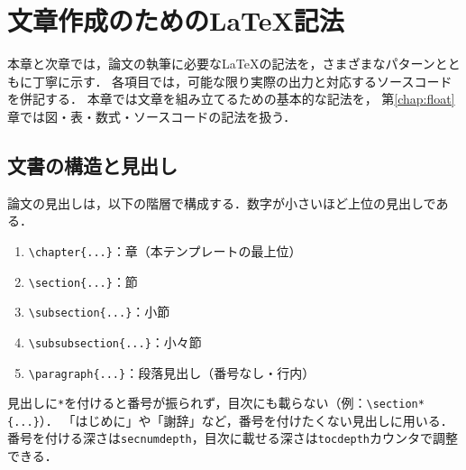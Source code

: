 \chapter{文章作成のための\LaTeX 記法}
\label{chap:latex}

本章と次章では，論文の執筆に必要な\LaTeX の記法を，さまざまなパターンとともに丁寧に示す．
各項目では，可能な限り実際の出力と対応するソースコードを併記する．
本章では文章を組み立てるための基本的な記法を，
第\ref{chap:float}章では図・表・数式・ソースコードの記法を扱う．

\section{文書の構造と見出し}
\label{sec:sectioning}
論文の見出しは，以下の階層で構成する．数字が小さいほど上位の見出しである．

\begin{enumerate}[label=\arabic*., leftmargin=*]
    \item \verb|\chapter{...}|：章（本テンプレートの最上位）
    \item \verb|\section{...}|：節
    \item \verb|\subsection{...}|：小節
    \item \verb|\subsubsection{...}|：小々節
    \item \verb|\paragraph{...}|：段落見出し（番号なし・行内）
\end{enumerate}

見出しに\verb|*|を付けると番号が振られず，目次にも載らない（例：\verb|\section*{...}|）．
「はじめに」や「謝辞」など，番号を付けたくない見出しに用いる．
番号を付ける深さは\verb|secnumdepth|，目次に載せる深さは\verb|tocdepth|カウンタで調整できる．

